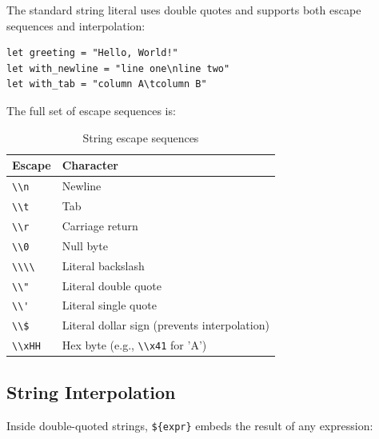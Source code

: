The standard string literal uses double quotes and supports both escape sequences and interpolation:

\begin{lstlisting}[language=Lattice, caption={Double-quoted strings}]
let greeting = "Hello, World!"
let with_newline = "line one\nline two"
let with_tab = "column A\tcolumn B"
\end{lstlisting}

The full set of escape sequences is:

\begin{table}[h]
\centering
\begin{tabular}{ll}
\toprule
\textbf{Escape} & \textbf{Character} \\
\midrule
\lstinline|\\n| & Newline \\
\lstinline|\\t| & Tab \\
\lstinline|\\r| & Carriage return \\
\lstinline|\\0| & Null byte \\
\lstinline|\\\\| & Literal backslash \\
\lstinline|\\"| & Literal double quote \\
\lstinline|\\'| & Literal single quote \\
\lstinline|\\$| & Literal dollar sign (prevents interpolation) \\
\lstinline|\\xHH| & Hex byte (e.g., \lstinline|\\x41| for 'A') \\
\bottomrule
\end{tabular}
\caption{String escape sequences}\label{tab:escape-sequences}
\end{table}

\subsection{String Interpolation}\label{subsec:string-interpolation}

Inside double-quoted strings, \lstinline|${expr}| embeds the result of any expression:


